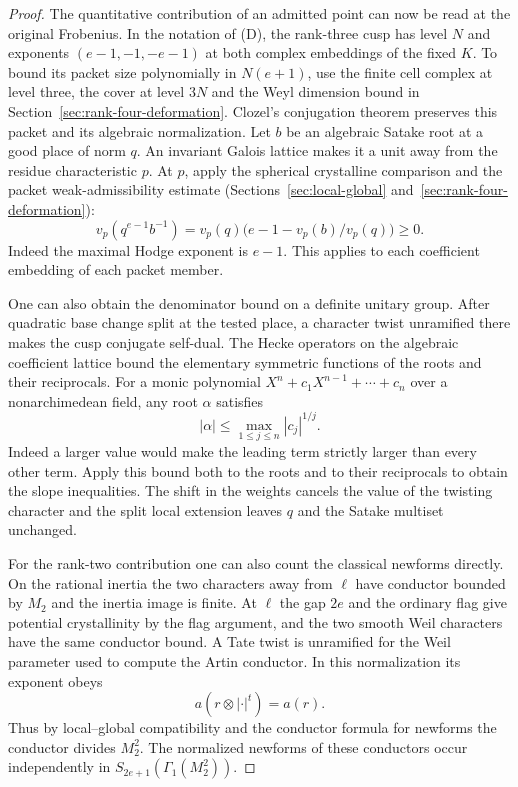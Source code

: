 \begin{proof}
The quantitative contribution of an admitted point can
now be read at the original Frobenius. In the notation
of (D), the rank-three cusp has level \(N\) and exponents
\((e-1,-1,-e-1)\) at both complex embeddings of the fixed
\(K\). To bound its packet size polynomially in \(N(e+1)\),
use the finite cell complex at level three, the cover at level
\(3N\) and the Weyl dimension bound
in Section~\ref{sec:rank-four-deformation}. Clozel's
conjugation theorem preserves this packet and its algebraic
normalization. Let \(b\) be an algebraic Satake root at a good
place of norm \(q\). An invariant Galois lattice makes it
a unit away from the residue characteristic \(p\).
At \(p\), apply the spherical crystalline comparison and the
packet weak-admissibility estimate
(Sections~\ref{sec:local-global} and~\ref{sec:rank-four-deformation}):
\[
 v_p(q^{e-1}b^{-1})
     =v_p(q)\bigl(e-1-v_p(b)/v_p(q)\bigr)\ge0 .
\]
Indeed the maximal Hodge exponent is \(e-1\). This applies to
each coefficient embedding of each packet member.

One can also obtain the denominator bound on a
definite unitary group. After quadratic base change split
at the tested place, a character twist unramified there
makes the cusp conjugate self-dual. The Hecke operators
on the algebraic coefficient lattice bound the elementary
symmetric functions of the roots and their reciprocals.
For a monic polynomial \(X^n+c_1 X^{n-1}+\cdots+c_n\) over a nonarchimedean field, any root \(\alpha\) satisfies
\[
 |\alpha|\le\max_{1\le j\le n}|c_j|^{1/j}.
\]
Indeed a larger value would make the leading term strictly larger than every other term. Apply this bound both to the roots and to their reciprocals to obtain the slope inequalities. The shift in the weights cancels
the value of the twisting character and the split local
extension leaves \(q\) and the Satake multiset unchanged.
\hfill\mbox{\cite{clozel-motifs,borel-serre,blggt,blggt-lg}}

For the rank-two contribution one can also count the
classical newforms directly. On the rational inertia the
two characters away from \(\ell\) have conductor bounded
by \(M_2\) and the inertia image is finite. At \(\ell\)
the gap \(2e\) and the ordinary flag give potential
crystallinity by the flag argument, and the two smooth
Weil characters have the same conductor bound. A Tate twist is unramified for the Weil parameter used to compute the Artin conductor. In this normalization its exponent obeys
\[
 a(r\otimes |\cdot|^t)=a(r).
\] Thus by
local--global compatibility and the conductor formula for
newforms the conductor divides \(M_2^2\). The normalized
newforms of these conductors occur independently in
\(S_{2e+1}(\Gamma_1(M_2^2))\).


\end{proof}

